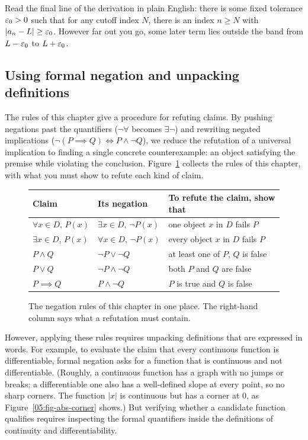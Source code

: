 Read the final line of the derivation in plain English: there is some fixed tolerance $\varepsilon_0 > 0$ such that for any cutoff index $N$, there is an index $n \ge N$ with $|a_n - L| \ge \varepsilon_0$. However far out you go, some later term lies outside the band from $L - \varepsilon_0$ to $L + \varepsilon_0$.

\subsection{Using formal negation and unpacking definitions}

The rules of this chapter give a procedure for refuting claims. By pushing negations past the quantifiers ($\neg \forall$ becomes $\exists \neg$) and rewriting negated implications ($\neg(P \implies Q) \iff P \land \neg Q$), we reduce the refutation of a universal implication to finding a single concrete counterexample: an object satisfying the premise while violating the conclusion. Figure~\ref{05:fig-rules-summary} collects the rules of this chapter, with what you must show to refute each kind of claim.

\begin{figure}[htbp]
\centering
\renewcommand{\arraystretch}{1.3}
\begin{tabular}{@{}lll@{}}
\toprule
\textbf{Claim} & \textbf{Its negation} & \textbf{To refute the claim, show that} \\
\midrule
$\forall x \in D,\, P(x)$ & $\exists x \in D,\, \neg P(x)$ & one object $x$ in $D$ fails $P$ \\
$\exists x \in D,\, P(x)$ & $\forall x \in D,\, \neg P(x)$ & every object $x$ in $D$ fails $P$ \\
$P \land Q$ & $\neg P \lor \neg Q$ & at least one of $P$, $Q$ is false \\
$P \lor Q$ & $\neg P \land \neg Q$ & both $P$ and $Q$ are false \\
$P \implies Q$ & $P \land \neg Q$ & $P$ is true and $Q$ is false \\
\bottomrule
\end{tabular}
\caption{The negation rules of this chapter in one place. The right-hand column says what a refutation must contain.}
\label{05:fig-rules-summary}
\end{figure}

However, applying these rules requires unpacking definitions that are expressed in words. For example, to evaluate the claim that every continuous function is differentiable, formal negation asks for a function that is continuous and not differentiable. (Roughly, a continuous function has a graph with no jumps or breaks; a differentiable one also has a well-defined slope at every point, so no sharp corners. The function $|x|$ is continuous but has a corner at $0$, as Figure~\ref{05:fig-abs-corner} shows.) But verifying whether a candidate function qualifies requires inspecting the formal quantifiers inside the definitions of continuity and differentiability.

